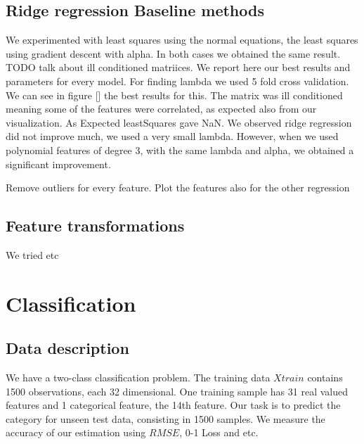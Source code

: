 \documentclass{article} %
\begin{document}
\subsection{Ridge regression Baseline methods}
 We experimented with least squares using the normal equations, the least squares using gradient descent with alpha.  In both cases we obtained the same result. TODO talk about ill conditioned matriices.
 We report here our best results and parameters for every model. 
 For finding lambda we used 5 fold cross validation. We can see in figure [] the best results for this.
 The matrix was ill conditioned meaning some of the features were correlated, as expected also from our visualization. As Expected leastSquares gave NaN. We observed ridge regression did not improve much, we used a very small lambda. However, when we used polynomial features of degree 3,  with the same lambda and alpha, we obtained a significant improvement.
 
 Remove outliers for every feature. Plot the features also for the other regression


\subsection{Feature transformations}
We tried etc


\section{Classification}
\subsection{Data description}
We have a two-class classification problem. The training data $Xtrain$ contains 1500 observations, each 32 dimensional. One training sample has 31 real valued features and 1 categorical feature, the 14th feature. Our task is to predict the category for unseen test data, consisting in 1500 samples. We measure the accuracy of our estimation using $RMSE$, 0-1 Loss and etc. 
\end{document}
